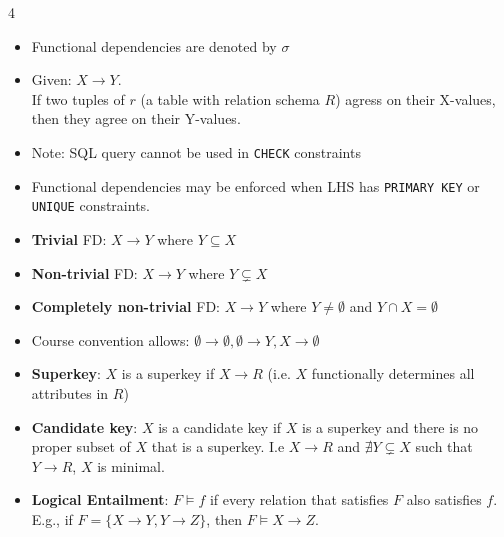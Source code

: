 \documentclass[10pt, landscape]{article}
\begin{document}
\begin{multicols*}{4}
  \begin{itemize}
    \item Functional dependencies are denoted by $\sigma$
    \item Given: $X \rightarrow Y$.\\If two tuples of $r$ (a table with relation schema $R$) agress on their X-values, then they agree on their Y-values.
    \item Note: SQL query cannot be used in \texttt{CHECK} constraints
    \item Functional dependencies may be enforced when LHS has \texttt{PRIMARY KEY} or \texttt{UNIQUE} constraints.
    \item \textbf{Trivial} FD: $X \rightarrow Y$ where $Y \subseteq X$
    \item \textbf{Non-trivial} FD: $X \rightarrow Y$ where $Y \subsetneq X$
    \item \textbf{Completely non-trivial} FD: $X \rightarrow Y$ where $Y \neq \emptyset$ and $Y \cap X = \emptyset$
    \item Course convention allows: $\emptyset \rightarrow \emptyset, \emptyset \rightarrow Y, X \rightarrow \emptyset$
    \item \textbf{Superkey}: $X$ is a superkey if $X \rightarrow R$ (i.e. $X$ functionally determines all attributes in $R$)
    \item \textbf{Candidate key}: $X$ is a candidate key if $X$ is a superkey and there is no proper subset of $X$ that is a superkey. I.e $X \rightarrow R$ and $\nexists Y \subsetneq X$ such that $Y \rightarrow R$, $X$ is minimal.
    \item \textbf{Logical Entailment}: $F \models f$ if every relation that satisfies $F$ also satisfies $f$. E.g., if $F = \{X \rightarrow Y, Y \rightarrow Z\}$, then $F \models X \rightarrow Z$.
  \end{itemize}


\end{multicols*}
\end{document}
